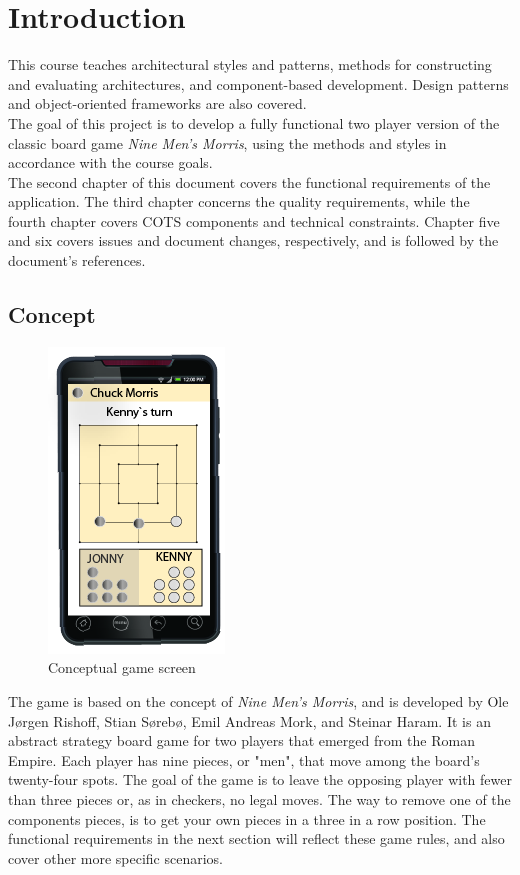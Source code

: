 \section{Introduction}
This course teaches architectural styles and patterns, methods for constructing and evaluating architectures, and component-based development. Design patterns and object-oriented frameworks are also covered. \\

The goal of this project is to develop a fully functional two player version of the classic board game \emph{Nine Men's Morris}, using the methods and styles in accordance with the course goals. \\

The second chapter of this document covers the functional requirements of the application. The third chapter concerns the quality requirements, while the fourth chapter covers COTS components and technical constraints. Chapter five and six covers issues and document changes, respectively, and is followed by the document's references.



\subsection{Concept}

\begin{figure}[h!]
\begin{center}
	\includegraphics{./concept.png}
	\end{center}
	\caption{Conceptual game screen}
\end{figure}

The game is based on the concept of \emph{Nine Men's Morris}, and is developed by Ole Jørgen Rishoff, Stian Sørebø, Emil Andreas Mork, and Steinar Haram. It is an abstract strategy board game for two players that emerged from the Roman Empire. Each player has nine pieces, or "men", that move among the board's twenty-four spots. The goal of the game is to leave the opposing player with fewer than three pieces or, as in checkers, no legal moves. The way to remove one of the components pieces, is to get your own pieces in a three in a row position. The functional requirements in the next section will reflect these game rules, and also cover other more specific scenarios. 



